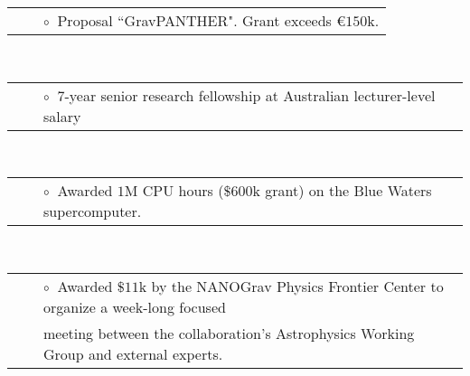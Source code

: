 \documentclass[11pt,letterpaper,sans]{moderncv}
\begin{document}
\begin{tabular}{rcl}
&\hspace{0.4cm} &{\color{color1} $\circ\;\;$}Proposal ``GravPANTHER". Grant exceeds \euro$150$k.
\end{tabular} \\
\begin{tabular}{rcl}
&\hspace{0.4cm} &{\color{color1} $\circ\;\;$}$7$-year senior research fellowship at Australian lecturer-level salary 
\end{tabular} \\
\begin{tabular}{rcl}
&\hspace{0.4cm} &{\color{color1} $\circ\;\;$}Awarded $1$M CPU hours ($\$600$k grant) on the Blue Waters supercomputer. \\
\end{tabular} \\
\begin{tabular}{rcl}
&\hspace{0.4cm} &{\color{color1} $\circ\;\;$}Awarded $\$11$k by the NANOGrav Physics Frontier Center to organize a week-long focused\\
&\hspace{0.4cm} &  \hspace{0.4cm}meeting between the collaboration's Astrophysics Working Group and external experts. \\
\end{tabular} \\
\end{document}

